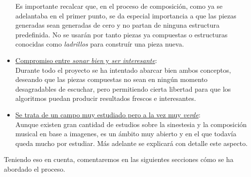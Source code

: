 \begin{itemize}
			Es importante recalcar que, en el proceso de composición, como ya se adelantaba en el primer punto, se da especial importancia a que las piezas generadas sean generadas de cero y no partan de ninguna estructura predefinida. No se usarán por tanto piezas ya compuestas o estructuras conocidas como \emph{ladrillos} para construír una pieza nueva.
		\item \underline{Compromiso entre \emph{sonar bien} y \emph{ser interesante}}:\\
			Durante todo el proyecto se ha intentado abarcar bien ambos conceptos, deseando que las piezas compuestas no sean en ningún momento desagradables de escuchar, pero permitiendo cierta libertad para que los algoritmos puedan producir resultados frescos e interesantes.
		\item \underline{Se trata de un campo muy estudiado pero a la vez muy \emph{verde}}:\\	
			Aunque existen gran cantidad de estudios sobre la sinestesia y la composición musical en base a imagenes, es un ámbito muy abierto y en el que todavía queda mucho por estudiar. Más adelante se explicará con detalle este aspecto.
			
		\end{itemize}
			
		Teniendo eso en cuenta, comentaremos en las siguientes secciones cómo se ha abordado el proceso. 
	



